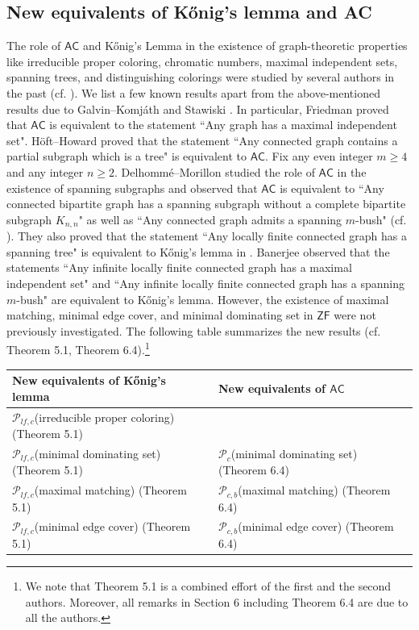 \documentclass[12pt,reqno,a4paper]{amsart}
\theoremstyle{definition}
\begin{document}
	\subsection{New equivalents of K\H{o}nig's lemma and AC} 
	The role of $\mathsf{AC}$ and K\H{o}nig’s Lemma in the existence of graph-theoretic properties like irreducible proper coloring, chromatic numbers, maximal independent sets, spanning trees, and distinguishing colorings were studied by several authors in the past (cf. \cite{Ban2023, Ban, DM2006, Fri2011, HH1973, GK1991, Spa2014, Sta2023}). We list a few known results apart from the above-mentioned results due to Galvin--Komj\'{a}th \cite{GK1991} and Stawiski \cite{Sta2023}. In particular, Friedman \cite[Theorem 6.3.2, Theorem 2.4]{Fri2011} proved
	that $\mathsf{AC}$ is equivalent to the statement ``Any graph has a maximal independent set". 
	H\"{o}ft--Howard \cite{HH1973} proved that the statement ``Any connected graph contains a partial subgraph which is a tree" is equivalent to $\mathsf{AC}$. Fix any even integer $m \geq 4$ and any integer $n\geq 2$. Delhomm\'{e}--Morillon \cite{DM2006} studied the role of $\mathsf{AC}$ in the existence of spanning subgraphs and observed that $\mathsf{AC}$ is equivalent to ``Any connected bipartite graph has a spanning subgraph without a complete bipartite subgraph $K_{n,n}$" as well as ``Any connected graph admits a spanning $m$-bush" (cf. \cite[Corollary 1, Remark 1]{DM2006}). They also proved that the statement ``Any locally finite connected graph has a spanning tree" is equivalent to K\H{o}nig's lemma in \cite[Theorem 2]{DM2006}. Banerjee \cite{Ban2023, Ban} observed that the statements ``Any infinite locally finite connected graph has a maximal independent set" and ``Any infinite locally finite connected graph has a spanning $m$-bush" are equivalent to K\H{o}nig's lemma. 
	However, the existence of maximal matching, minimal edge cover, and minimal dominating set in $\mathsf{ZF}$ were not previously investigated. The following table summarizes the new results (cf. Theorem 5.1, Theorem 6.4).\footnote{We note that Theorem 5.1 is a combined effort of the first and the second authors. Moreover, all remarks in Section 6 including Theorem 6.4 are due to all the authors.}
	\begin{center}
		\begin{tabular}{|l|l|l| } 
			\hline New equivalents of K\H{o}nig's lemma & New equivalents of $\mathsf{AC}$ \\ 
			\hline
			$\mathcal{P}_{lf,c}$(irreducible proper coloring) (Theorem 5.1) & \\ 
			$\mathcal{P}_{lf,c}$(minimal dominating set) (Theorem 5.1) & $\mathcal{P}_{c}$(minimal dominating set) (Theorem 6.4)
			\\  
			$\mathcal{P}_{lf,c}$(maximal matching) (Theorem 5.1) & $\mathcal{P}_{c,b}$(maximal matching) (Theorem 6.4) 
			\\
			$\mathcal{P}_{lf,c}$(minimal edge cover) (Theorem 5.1) & $\mathcal{P}_{c,b}$(minimal edge cover) (Theorem 6.4) \\
			\hline
		\end{tabular}
	\end{center}
	
\end{document}
